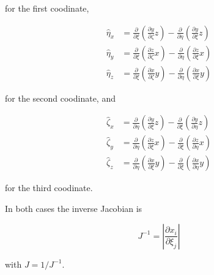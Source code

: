 for the first coodinate,

\[ \begin{aligned} \hat{\eta}_x &= \frac{\partial}{\partial \xi}\left(\frac{\partial y}{\partial \zeta}z\right) - \frac{\partial}{\partial \eta}\left(\frac{\partial y}{\partial \xi}z\right) \\ \hat{\eta}_y &= \frac{\partial}{\partial \xi}\left(\frac{\partial z}{\partial \zeta}x\right) - \frac{\partial}{\partial \eta}\left(\frac{\partial z}{\partial \xi}x\right) \\ \hat{\eta}_z &= \frac{\partial}{\partial \xi}\left(\frac{\partial x}{\partial \zeta}y\right) - \frac{\partial}{\partial \eta}\left(\frac{\partial x}{\partial \xi}y\right) \end{aligned} \]

for the second coodinate, and

\[ \begin{aligned} \hat{\zeta}_x &= \frac{\partial}{\partial \eta}\left(\frac{\partial y}{\partial \xi}z\right) - \frac{\partial}{\partial \xi}\left(\frac{\partial y}{\partial \eta}z\right) \\ \hat{\zeta}_y &= \frac{\partial}{\partial \eta}\left(\frac{\partial z}{\partial \xi}x\right) - \frac{\partial}{\partial \xi}\left(\frac{\partial z}{\partial \eta}x\right) \\ \hat{\zeta}_z &= \frac{\partial}{\partial \eta}\left(\frac{\partial x}{\partial \xi}y\right) - \frac{\partial}{\partial \xi}\left(\frac{\partial x}{\partial \eta}y\right) \end{aligned} \]

for the third coodinate.

In both cases the inverse Jacobian is

\[ J^{-1} = \left|\frac{\partial x_i}{\partial \xi_j}\right| \]

with $J = 1/J^{-1}$. 
